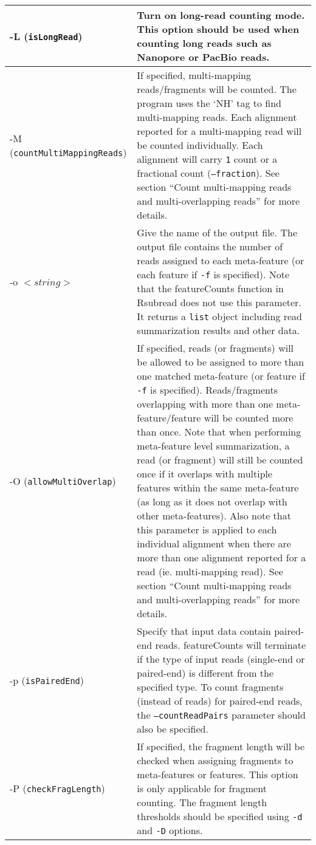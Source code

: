 \documentclass[12pt]{report}
\newcommand{\code}[1]{{\small\texttt{#1}}}
\newcommand{\Rsubread}{\textsf{Rsubread}}
\newcommand{\featureCounts}{\textsf{featureCounts}}
\begin{document}
\begin{longtable}{|p{5cm}|p{11cm}|}
\hline
-L \newline (\code{isLongRead}) & Turn on long-read counting mode. This option should be used when counting long reads such as Nanopore or PacBio reads.\\
\hline
-M \newline (\code{countMultiMappingReads}) & If specified, multi-mapping reads/fragments will be counted. The program uses the `NH' tag to find multi-mapping reads. Each alignment reported for a multi-mapping read will be counted individually. Each alignment will carry \code{1} count or a fractional count (\code{--fraction}). See section ``Count multi-mapping reads and multi-overlapping reads'' for more details.\\
\hline
-o $<string>$ & Give the name of the output file. The output file contains the number of reads assigned to each meta-feature (or each feature if \code{-f} is specified). Note that the {\featureCounts} function in {\Rsubread} does not use this parameter. It returns a \code{list} object including read summarization results and other data. \\
\hline
-O \newline (\code{allowMultiOverlap}) & If specified, reads (or fragments) will be allowed to be assigned to more than one matched meta-feature (or feature if \code{-f} is specified). Reads/fragments overlapping with more than one meta-feature/feature will be counted more than once. Note that when performing meta-feature level summarization, a read (or fragment) will still be counted once if it overlaps with multiple features within the same meta-feature (as long as it does not overlap with other meta-features). Also note that this parameter is applied to each individual alignment when there are more than one alignment reported for a read (ie. multi-mapping read). See section ``Count multi-mapping reads and multi-overlapping reads'' for more details.\\
\hline
-p \newline (\code{isPairedEnd}) & Specify that input data contain paired-end reads. {\featureCounts} will terminate if the type of input reads (single-end or paired-end) is different from the specified type. To count fragments (instead of reads) for paired-end reads, the \code{--countReadPairs} parameter should also be specified. \\
\hline
-P \newline (\code{checkFragLength}) & If specified, the fragment length will be checked when assigning fragments to meta-features or features. This option is only applicable for fragment counting. The fragment length thresholds should be specified using \code{-d} and \code{-D} options.\\

\end{longtable}
\end{document}
